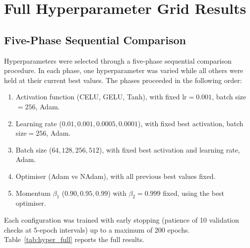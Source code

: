 \section{Full Hyperparameter Grid Results}
\label{annexure:hyperparameters}

\subsection{Five-Phase Sequential Comparison}
\label{annexure:five_phase}

Hyperparameters were selected through a five-phase sequential comparison procedure. In each phase, one hyperparameter was varied while all others were held at their current best values. The phases proceeded in the following order:

\begin{enumerate}
    \item Activation function (CELU, GELU, Tanh), with fixed lr${}=0.001$, batch size${}=256$, Adam.
    \item Learning rate ($0.01, 0.001, 0.0005, 0.0001$), with fixed best activation, batch size${}=256$, Adam.
    \item Batch size ($64, 128, 256, 512$), with fixed best activation and learning rate, Adam.
    \item Optimiser (Adam vs NAdam), with all previous best values fixed.
    \item Momentum $\beta_1$ ($0.90, 0.95, 0.99$) with $\beta_2 = 0.999$ fixed, using the best optimiser.
\end{enumerate}

Each configuration was trained with early stopping (patience of 10 validation checks at 5-epoch intervals) up to a maximum of 200 epochs. Table~\ref{tab:hyper_full} reports the full results.

